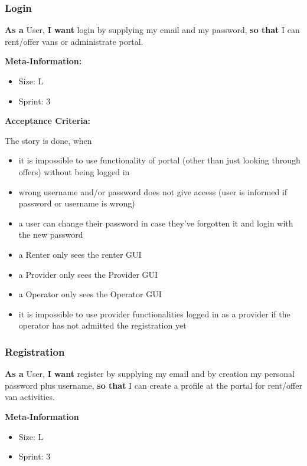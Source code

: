\subsubsection{Login}

\textbf{As a} User,\hfill\break
\textbf{I want} login by supplying my email and my password,\hfill\break
\textbf{so that} I can rent/offer vans or administrate portal.

\textbf{Meta-Information:}
\begin{itemize}
    \item Size: L
    \item Sprint: 3
\end{itemize}

\textbf{Acceptance Criteria:}

The story is done, when
\begin{itemize}
    \item it is impossible to use functionality of portal (other than just looking through offers) without being logged in
    \item wrong username and/or password does not give access (user is informed if password or username is wrong)
    \item a user can change their password in case they've forgotten it and login with the new password
    \item a Renter only sees the renter GUI
    \item a Provider only sees the Provider GUI
    \item a Operator only sees the Operator GUI
    \item it is impossible to use provider functionalities logged in as a provider if the operator has not admitted the registration yet
\end{itemize}

\subsubsection{Registration}

\textbf{As a} User,\hfill\break
\textbf{I want} register by supplying my email and by creation my personal password plus username,\hfill\break
\textbf{so that} I can create a profile at the portal for rent/offer van activities.

\textbf{Meta-Information}
\begin{itemize}
    \item Size: L
    \item Sprint: 3
\end{itemize}

